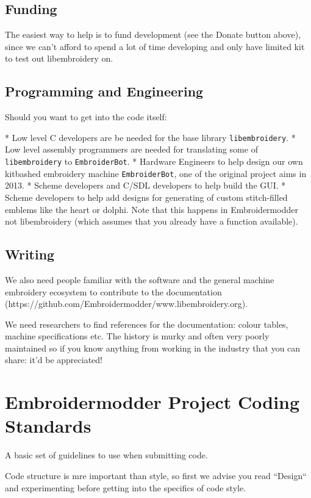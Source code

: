\documentclass[11pt]{report}
\begin{document}
\subsection{Funding}

The easiest way to help is to fund development (see the Donate button above),
since we can't afford to spend a lot of time developing and only have limited
kit to test out libembroidery on.

\subsection{Programming and Engineering}

Should you want to get into the code itself:

* Low level C developers are be needed for the base library \texttt{libembroidery}.
* Low level assembly programmers are needed for translating some of \texttt{libembroidery} to \texttt{EmbroiderBot}.
* Hardware Engineers to help design our own kitbashed embroidery machine \texttt{EmbroiderBot}, one of the original project aims in 2013.
* Scheme developers and C/SDL developers to help build the GUI.
* Scheme developers to help add designs for generating of custom stitch-filled emblems like the heart or dolphi. Note that this happens in Embroidermodder not libembroidery (which assumes that you already have a function available).

\subsection{Writing}

We also need people familiar with the software and the general
machine embroidery ecosystem to contribute to the
documentation (https://github.com/Embroidermodder/www.libembroidery.org).

We need researchers to find references for the documentation: colour tables,
machine specifications etc. The history is murky and often very poorly maintained
so if you know anything from working in the industry that you can share: it'd be
appreciated!

\section{Embroidermodder Project Coding Standards}

A basic set of guidelines to use when submitting code.

Code structure is mre important than style, so first we advise you read
``Design`` and experimenting before getting into the specifics of code style.
\end{document}
